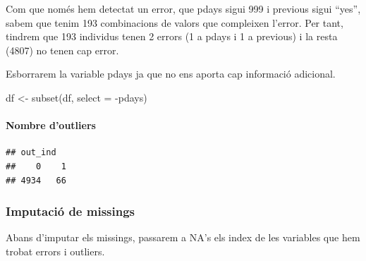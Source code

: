 \documentclass[
]{article}
\newenvironment{Shaded}{\begin{snugshade}}{\end{snugshade}}
\newcommand{\AttributeTok}[1]{\textcolor[rgb]{0.77,0.63,0.00}{#1}}
\newcommand{\ConstantTok}[1]{\textcolor[rgb]{0.00,0.00,0.00}{#1}}
\newcommand{\FunctionTok}[1]{\textcolor[rgb]{0.00,0.00,0.00}{#1}}
\newcommand{\NormalTok}[1]{#1}
\newcommand{\OtherTok}[1]{\textcolor[rgb]{0.56,0.35,0.01}{#1}}
\newcommand{\SpecialCharTok}[1]{\textcolor[rgb]{0.00,0.00,0.00}{#1}}
\begin{document}
Com que només hem detectat un error, que pdays sigui 999 i previous
sigui ``yes'', sabem que tenim 193 combinacions de valors que compleixen
l'error. Per tant, tindrem que 193 individus tenen 2 errors (1 a pdays i
1 a previous) i la resta (4807) no tenen cap error.

Esborrarem la variable pdays ja que no ens aporta cap informació
adicional.

\begin{Shaded}
\begin{Highlighting}[]
\NormalTok{df }\OtherTok{\textless{}{-}} \FunctionTok{subset}\NormalTok{(df, }\AttributeTok{select =} \SpecialCharTok{{-}}\NormalTok{pdays)}
\end{Highlighting}
\end{Shaded}

\hypertarget{nombre-doutliers-1}{%
\paragraph{Nombre d'outliers}\label{nombre-doutliers-1}}

\begin{Shaded}
\end{Shaded}

\begin{verbatim}
## out_ind
##    0    1 
## 4934   66
\end{verbatim}

\hypertarget{imputaciuxf3-de-missings}{%
\subsubsection{Imputació de missings}\label{imputaciuxf3-de-missings}}

Abans d'imputar els missings, passarem a NA's els index de les variables
que hem trobat errors i outliers.

\begin{Shaded}
\end{Shaded}
\end{document}
